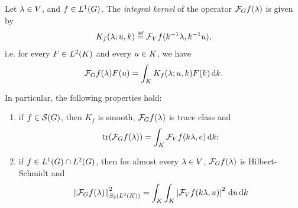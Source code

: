 \begin{lemma}
\label{lemma:kernels_of_Fourier_coefficients}
    Let $\lambda \in \VectorSpace$, and $f \in \Lebesgue{1}\Group$.
    The \emph{integral kernel} of the operator $\Fourier f(\lambda)$ is given by
    \begin{align}
        K_{f}(\lambda; u, k) \defeq \Fourier[\VectorSpace] f(k^{-1} \lambda, k^{-1} u),
        \label{integral_kernel_of_Fourier_coefficient}
    \end{align}
    i.e. for every $F \in \Lebesgue{2}\CompactGroup$ and every $u \in \CompactGroup$, we have
    \begin{align*}
        \Fourier f(\lambda) F(u) = \int_\CompactGroup K_f(\lambda; u, k) F(k) \dd k.
    \end{align*}

    In particular, the following properties hold:
    \begin{enumerate}
        \item if $f \in \Schwartz\Group$, then $K_f$ is smooth,
            $\Fourier f(\lambda)$ is trace class and
            \begin{align*}
                \tr(\Fourier f(\lambda)) = \int_\CompactGroup \Fourier[\VectorSpace] f(k \lambda, e) \dd k;
            \end{align*}
        \item if $f \in \Lebesgue{1}\Group \cap \Lebesgue{2}\Group$, then for almost every $\lambda \in \VectorSpace$,
            $\Fourier f(\lambda)$ is Hilbert-Schmidt and
            \begin{align*}
                \norm[\SchattenClasses{2}{\Lebesgue{2}\CompactGroup}]{\Fourier f(\lambda)}^2
                = \int_\CompactGroup \int_\CompactGroup \abs{\Fourier[\VectorSpace] f(k \lambda, u)}^2 \dd u \dd k
            \end{align*}
    \end{enumerate}
\end{lemma}
